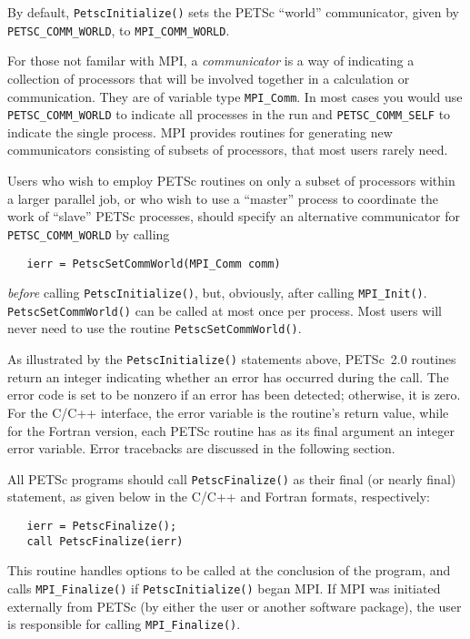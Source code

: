 By default, {\tt PetscInitialize()} sets the PETSc ``world''
communicator, given by {\tt PETSC\_COMM\_WORLD}, to {\tt MPI\_COMM\_WORLD}.

For those not familar with MPI, a {\em communicator} is a way of indicating
a collection of processors that will be involved together in a calculation
or communication. They are of variable type {\tt MPI_Comm}. In most cases
you would use {\tt PETSC\_COMM\_WORLD} to indicate all processes in the 
run and {\tt PETSC\_COMM\_SELF} to indicate the single process. MPI provides
routines for generating new communicators consisting of subsets of processors,
that most users rarely need.

Users who wish to employ PETSc routines on only a subset
of processors within a larger parallel job, or who wish to use a
``master'' process to coordinate the work of ``slave'' PETSc
processes, should specify an alternative communicator for {\tt
PETSC\_COMM\_WORLD} by calling 
\begin{verbatim}
   ierr = PetscSetCommWorld(MPI_Comm comm)
\end{verbatim}
{\em before} calling {\tt PetscInitialize()}, but, obviously, after
calling {\tt MPI\_Init()}. {\tt PetscSetCommWorld()} can be called
at most once per process. Most users will never need to use the routine
{\tt PetscSetCommWorld()}.

As illustrated by the {\tt PetscInitialize()} statements above,
PETSc~2.0 routines return an integer indicating whether an error has
occurred during the call.  The error code is set to be nonzero if an
error has been detected; otherwise, it is zero.  For the C/C++
interface, the error variable is the routine's return value, while for
the Fortran version, each PETSc routine has as its final argument an
integer error variable.  Error tracebacks are discussed in the following
section.

All PETSc programs should call {\tt PetscFinalize()} 
as their final (or nearly final) statement, as given below in the C/C++
and Fortran formats, respectively:
\begin{verbatim}
   ierr = PetscFinalize();
   call PetscFinalize(ierr)
\end{verbatim}
This routine handles options to be called at the conclusion of
the program, and calls {\tt MPI\_Finalize()} 
if {\tt PetscInitialize()}
began MPI. If MPI was initiated externally from PETSc (by either
the user or another software package), the user is
responsible for calling {\tt MPI\_Finalize()}. 

